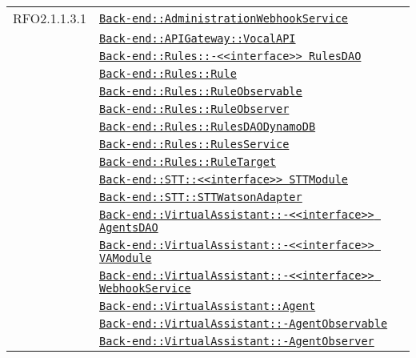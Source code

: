 \begin{longtable}{|>{\centering}m{3cm}|m{10cm}<{\centering}|}
RFO2.1.1.3.1 & \hyperref[Back-end::AdministrationWebhookService]{\texttt{Back-end::AdministrationWebhookService}}\\
& \hyperref[Back-end::APIGateway::VocalAPI]{\texttt{Back-end::APIGateway::VocalAPI}}\\
& \hyperref[Back-end::Rules::<<interface>> RulesDAO]{\texttt{Back-end::Rules::-\linebreak <<interface>> RulesDAO}}\\
& \hyperref[Back-end::Rules::Rule]{\texttt{Back-end::Rules::Rule}}\\
& \hyperref[Back-end::Rules::RuleObservable]{\texttt{Back-end::Rules::RuleObservable}}\\
& \hyperref[Back-end::Rules::RuleObserver]{\texttt{Back-end::Rules::RuleObserver}}\\
& \hyperref[Back-end::Rules::RulesDAODynamoDB]{\texttt{Back-end::Rules::RulesDAODynamoDB}}\\
& \hyperref[Back-end::Rules::RulesService]{\texttt{Back-end::Rules::RulesService}}\\
& \hyperref[Back-end::Rules::RuleTarget]{\texttt{Back-end::Rules::RuleTarget}}\\
& \hyperref[Back-end::STT::<<interface>> STTModule]{\texttt{Back-end::STT::<<interface>> STTModule}}\\
& \hyperref[Back-end::STT::STTWatsonAdapter]{\texttt{Back-end::STT::STTWatsonAdapter}}\\
& \hyperref[Back-end::VirtualAssistant::<<interface>> AgentsDAO]{\texttt{Back-end::VirtualAssistant::-\linebreak <<interface>> AgentsDAO}}\\
& \hyperref[Back-end::VirtualAssistant::<<interface>> VAModule]{\texttt{Back-end::VirtualAssistant::-\linebreak <<interface>> VAModule}}\\
& \hyperref[Back-end::VirtualAssistant::<<interface>> WebhookService]{\texttt{Back-end::VirtualAssistant::-\linebreak <<interface>> WebhookService}}\\
& \hyperref[Back-end::VirtualAssistant::Agent]{\texttt{Back-end::VirtualAssistant::Agent}}\\
& \hyperref[Back-end::VirtualAssistant::AgentObservable]{\texttt{Back-end::VirtualAssistant::-\linebreak AgentObservable}}\\
& \hyperref[Back-end::VirtualAssistant::AgentObserver]{\texttt{Back-end::VirtualAssistant::-\linebreak AgentObserver}}\\

\end{longtable}
